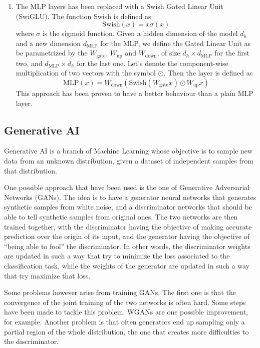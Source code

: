 \documentclass[]{marticle}
\begin{document}
\begin{enumerate}
\item The MLP layers has been replaced with a Swish Gated Linear Unit (SwiGLU). The function Swish
is defined as
$$ \text{Swish}(x) = x \sigma(x) $$
where $\sigma$ is the sigmoid function. Given a hidden dimension of the model $d_h$ and a new
dimension $d_\text{MLP}$ for the MLP, we define the Gated Linear Unit as be parametrized by the
$W_\text{gate}$, $W_\text{up}$ and $W_\text{down}$, of size $d_h\times d_\text{MLP}$ for the first
two, and $d_\text{MLP} \times d_h$ for the last one. Let's denote the component-wise multiplication
of two vectors with the symbol $\odot$. Then the layer is defined as $$ \text{MLP}(x) =
W_\text{down} (\text{Swish}(W_\text{gate} x) \odot W_\text{up} x) $$ This approach has been proven
to have a better behaviour than a plain MLP layer.
\end{enumerate}

\subsection{Generative AI}

Generative AI is a branch of Machine Learning whose objective is to sample new data from an unknown
distribution, given a dataset of independent samples from that distribution.

One possible approach that have been used is the one of Generative Adversarial Networks
(GANs)\cite{gans}. The idea is to have a generator neural networks that generates synthetic samples
from white noise, and a discriminator networks that should be able to tell synthetic samples from
original ones. The two networks are then trained together, with the discriminator having the
objective of making accurate prediction over the origin of its input, and the generator having the
objective of ``being able to fool'' the discriminator. In other words, the discriminator weights are
updated in such a way that try to minimize the loss associated to the classification task, while the
weights of the generator are updated in such a way that try maximize that loss.

Some problems however arise from training GANs. The first one is that the convergence of the joint
training of the two networks is often hard. Some steps have been made to tackle this problem. WGANs
\cite{wgans} are one possible improvement, for example. Another problem is that often generators end
up sampling only a partial region of the whole distribution, the one that creates more difficulties
to the discriminator.
\end{document}
